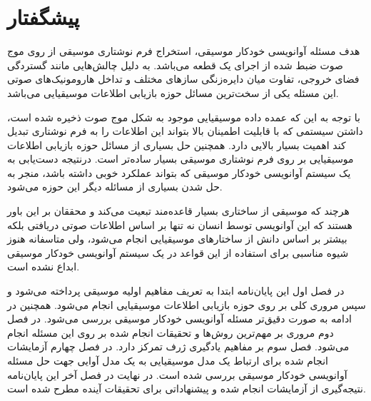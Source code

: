 \chapter*{پیشگفتار}
هدف مسئله آوانویسی خودکار موسیقی، استخراج فرم نوشتاری موسیقی از روی موج صوت ضبط
شده از اجرای یک قطعه می‌باشد. به دلیل چالش‌هایی مانند گستردگی فضای خروجی، تفاوت
میان دایره‌زنگی سازهای مختلف و تداخل هارومونیک‌های صوتی این مسئله یکی از
سخت‌ترین مسائل حوزه بازیابی اطلاعات موسیقیایی می‌باشد.

با توجه به این که عمده داده موسیقیایی موجود به شکل موج صوت ذخیره شده است، داشتن
سیستمی که با قابلیت اطمینان بالا بتواند این اطلاعات را به فرم نوشتاری تبدیل کند
اهمیت بسیار بالایی دارد. همچنین حل بسیاری از مسائل حوزه بازیابی اطلاعات
موسیقیایی بر روی فرم نوشتاری موسیقی بسیار ساده‌تر است. درنتیجه دست‌یابی به یک
سیستم آوانویسی خودکار موسیقی که بتواند عملکرد خوبی داشته باشد، منجر به حل شدن
بسیاری از مسائله دیگر این حوزه می‌شود.

هرچند که موسیقی از ساختاری بسیار قاعده‌مند تبعیت می‌کند و محققان بر این باور
هستند که این آوانویسی توسط انسان نه تنها بر اساس اطلاعات صوتی دریافتی بلکه بیشتر
بر اساس دانش از ساختارهای موسیقیایی انجام می‌شود، ولی متاسفانه هنوز شیوه مناسبی
برای استفاده از این قواعد در یک سیستم آوانویسی خودکار موسیقی ابداع نشده است.

در فصل اول این پایان‌نامه ابتدا به تعریف مفاهیم اولیه موسیقی پرداخته می‌شود و
سپس مروری کلی بر روی حوزه بازیابی اطلاعات موسیقیایی انجام می‌شود. همچنین در
ادامه به صورت دقیق‌تر مسئله آوانویسی خودکار موسیقی بررسی می‌شود. در فصل دوم
مروری بر مهم‌ترین روش‌ها و تحقیقات انجام شده بر روی این مسئله انجام می‌شود. فصل
سوم بر مفاهیم یادگیری ژرف تمرکز دارد. در فصل چهارم آزمایشات انجام شده برای
ارتباط یک مدل موسیقیایی به یک مدل آوایی جهت حل مسئله آوانویسی خودکار موسیقی
بررسی شده است. در نهایت در فصل آخر این پایان‌نامه نتیجه‌گیری از آزمایشات انجام
شده و پیشنهاداتی برای تحقیقات آینده مطرح شده است.